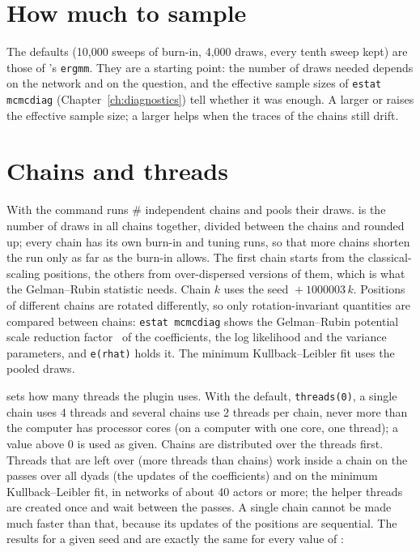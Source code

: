 \section{How much to sample}

The defaults (10,000 sweeps of burn-in, 4,000 draws, every tenth sweep kept) are those of \latentnet{}'s \texttt{ergmm}. They are a starting point: the number of draws needed depends on the network and on the question, and the effective sample sizes of \texttt{estat mcmcdiag} (Chapter~\ref{ch:diagnostics}) tell whether it was enough. A larger  or  raises the effective sample size; a larger  helps when the traces of the chains still drift.

\section{Chains and threads}\label{sec:chains}

With  the command runs \# independent chains and pools their draws.  is the number of draws in all chains together, divided between the chains and rounded up; every chain has its own burn-in and tuning runs, so that more chains shorten the run only as far as the burn-in allows. The first chain starts from the classical-scaling positions, the others from over-dispersed versions of them, which is what the Gelman--Rubin statistic needs. Chain $k$ uses the seed ${}+1000003\,k$. Positions of different chains are rotated differently, so only rotation-invariant quantities are compared between chains: \texttt{estat mcmcdiag} shows the Gelman--Rubin potential scale reduction factor~\cite{gelman1992} of the coefficients, the log likelihood and the variance parameters, and \texttt{e(rhat)} holds it. The minimum Kullback--Leibler fit uses the pooled draws.

 sets how many threads the plugin uses. With the default, \texttt{threads(0)}, a single chain uses 4 threads and several chains use 2 threads per chain, never more than the computer has processor cores (on a computer with one core, one thread); a value above 0 is used as given. Chains are distributed over the threads first. Threads that are left over (more threads than chains) work inside a chain on the passes over all dyads (the updates of the coefficients) and on the minimum Kullback--Leibler fit, in networks of about 40 actors or more; the helper threads are created once and wait between the passes. A single chain cannot be made much faster than that, because its updates of the positions are sequential. The results for a given seed and  are exactly the same for every value of :

